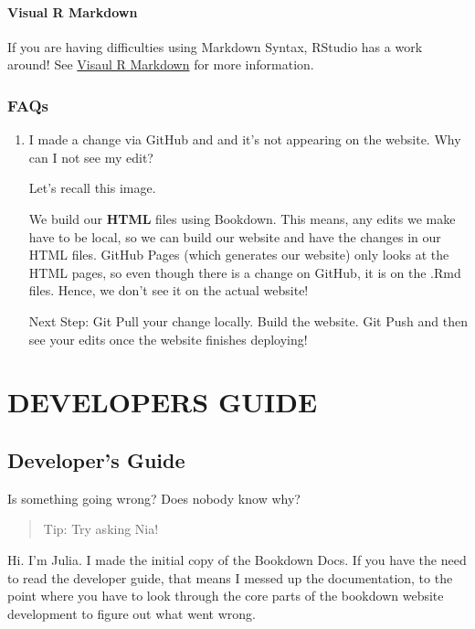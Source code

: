 \documentclass[
]{book}
\theoremstyle{definition}
\theoremstyle{definition}
\theoremstyle{definition}
\theoremstyle{definition}
\theoremstyle{remark}
\begin{document}
\subsection{Visual R Markdown}\label{visual-r-markdown}

If you are having difficulties using Markdown Syntax, RStudio has a work around! See \hyperref[visual-r-md]{Visaul R Markdown} for more information.

\section{FAQs}\label{faqs}

\begin{enumerate}
\def\labelenumi{\arabic{enumi}.}
\item
  I made a change via GitHub and and it's not appearing on the website. Why can I not see my edit?

  Let's recall this image.

  We build our \textbf{HTML} files using Bookdown. This means, any edits we make have to be local, so we can build our website and have the changes in our HTML files. GitHub Pages (which generates our website) only looks at the HTML pages, so even though there is a change on GitHub, it is on the .Rmd files. Hence, we don't see it on the actual website!

  Next Step: Git Pull your change locally. Build the website. Git Push and then see your edits once the website finishes deploying!
\end{enumerate}

\part{DEVELOPERS GUIDE}\label{part-developers-guide}

\chapter{Developer's Guide}\label{developers-guide}

Is something going wrong? Does nobody know why?

\begin{quote}
Tip: Try asking Nia!
\end{quote}

Hi. I'm Julia. I made the initial copy of the Bookdown Docs. If you have the need to read the developer guide, that means I messed up the documentation, to the point where you have to look through the core parts of the bookdown website development to figure out what went wrong.
\end{document}
